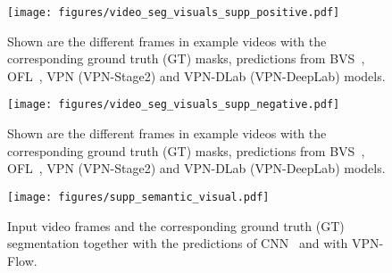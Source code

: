 
\begin{figure}[th!]
\begin{center}
  \centerline{\texttt{[image: figures/video\_seg\_visuals\_supp\_positive.pdf]}}
    {Shown are the different frames in example videos with the corresponding
    ground truth (GT) masks, predictions from BVS~\cite{marki2016bilateral},
    OFL~\cite{tsaivideo}, VPN (VPN-Stage2) and VPN-DLab (VPN-DeepLab) models.}
    \label{fig:video_seg_pos_supp}
\end{center}
\vspace{-1.0cm}
\end{figure}

\begin{figure}[th!]
\begin{center}
  \centerline{\texttt{[image: figures/video\_seg\_visuals\_supp\_negative.pdf]}}
    {Shown are the different frames in example videos with the corresponding
    ground truth (GT) masks, predictions from BVS~\cite{marki2016bilateral},
    OFL~\cite{tsaivideo}, VPN (VPN-Stage2) and VPN-DLab (VPN-DeepLab) models.}
    \label{fig:video_seg_neg_supp}
\end{center}
\vspace{-1.0cm}
\end{figure}

\begin{figure}[th!]
\begin{center}
  \centerline{\texttt{[image: figures/supp\_semantic\_visual.pdf]}}
    {Input video frames and the corresponding ground truth (GT)
    segmentation together with the predictions of CNN~\cite{yu2015multi} and with
    VPN-Flow.}
    \label{fig:semantic_visuals_supp}
\end{center}
\vspace{-0.7cm}
\end{figure}

